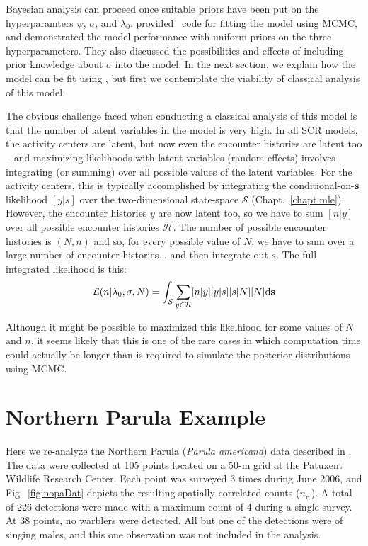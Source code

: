 Bayesian analysis can proceed once suitable priors have been put on
the hyperparamters $\psi$, $\sigma$, and
$\lambda_0$. \citet{chandler_royle:2013} provided \R~code for fitting
the model using MCMC, and demonstrated the model performance with
uniform priors on the three hyperparameters. They also discussed the
possibilities and effects of including prior knowledge about $\sigma$
into the model. In the next section, we explain how the model can be
fit using \jags, but first we contemplate the viability of classical
analysis of this model.

The obvious challenge faced when conducting a classical analysis of
this model is that the number of latent variables in the
model is very high. In all SCR models, the activity centers are
latent, but now even the encounter histories are latent too -- and
maximizing likelihoods with latent variables (random effects) involves
integrating (or summing) over all possible values of the latent
variables. For the activity centers, this is typically accomplished by
integrating the conditional-on-$\bf s$ likelihood $[y|s]$ over the two-dimensional
state-space $\mathcal{S}$ (Chapt.~\ref{chapt.mle}). However, the
encounter histories $y$ are now latent too, so we have to sum $[n|y]$
over all possible encounter histories $\mathcal{H}$. The number of
possible encounter histories is $(N,n)$ and so, for every
possible value of $N$, we have to sum over a large number of encounter
histories$\dots$ and then integrate out $s$. The full integrated
likelihood is this:
\begin{equation}
  \mathcal{L}(n|\lambda_0, \sigma, N) = \int_{\mathcal{S}} \sum_{y \in \mathcal{H}} [n|y][y|s][s|N][N] \mathrm{d}{\bf s}
  \label{eq:1}
\end{equation}

Although it might be possible to maximized this likelhiood for some
values of $N$ and $n$, it seems likely that this is one of the rare
cases in which computation time could actually be longer than is
required to simulate the posterior distributions using MCMC.



\section{Northern Parula Example}

Here we re-analyze the Northern Parula ({\it Parula americana}) data
described in \citet{chandler_royle:2012}. The data were collected at
105 points located on a 50-m grid at the Patuxent Wildlife Research
Center. Each point was surveyed 3 times during June 2006, and
Fig.~\ref{fig:nopaDat} depicts the resulting spatially-correlated
counts ($n_{r.}$).
A total of 226 detections were made with a maximum count of 4 during a
single survey. At 38 points, no warblers were detected. All but one of
the detections were of singing males, and this one observation was
not included in the analysis.


